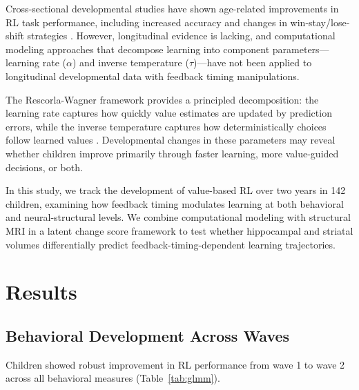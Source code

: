 \documentclass[11pt]{article}
\begin{document}
Cross-sectional developmental studies have shown age-related improvements in RL task performance, including increased accuracy and changes in win-stay/lose-shift strategies \citep{decker2016}. However, longitudinal evidence is lacking, and computational modeling approaches that decompose learning into component parameters---learning rate ($\alpha$) and inverse temperature ($\tau$)---have not been applied to longitudinal developmental data with feedback timing manipulations.

The Rescorla-Wagner framework \citep{rescorla1972} provides a principled decomposition: the learning rate captures how quickly value estimates are updated by prediction errors, while the inverse temperature captures how deterministically choices follow learned values \citep{daw2011}. Developmental changes in these parameters may reveal whether children improve primarily through faster learning, more value-guided decisions, or both.

In this study, we track the development of value-based RL over two years in 142 children, examining how feedback timing modulates learning at both behavioral and neural-structural levels. We combine computational modeling with structural MRI in a latent change score framework to test whether hippocampal and striatal volumes differentially predict feedback-timing-dependent learning trajectories.

\section{Results}

\subsection{Behavioral Development Across Waves}

Children showed robust improvement in RL performance from wave 1 to wave 2 across all behavioral measures (Table~\ref{tab:glmm}).
\end{document}
